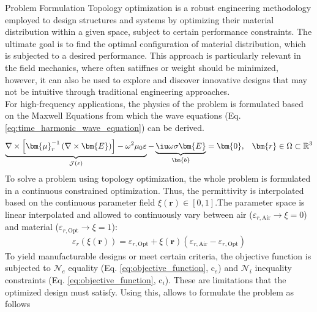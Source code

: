 \begin{frame}[t]
\begin{columns}[t]
\begin{column}{\colwidth}
    \begin{block}{Problem Formulation}
      Topology optimization is a robust engineering methodology employed to design structures and systems by optimizing their material distribution within a given space, subject to certain performance constraints. 
      The ultimate goal is to find the optimal configuration of material distribution, which is subjected to a desired performance.  This approach is particularly relevant in the field mechanics, where often satiffnes or weight should be minimized, however, it can also be used to explore and discover innovative designs that may not be intuitive through traditional engineering approaches.\\
      For high-frequency applications, the physics of the problem is formulated based on the Maxwell Equations from which the wave equations (Eq. \ref{eq:time_harmonic_wave_equation}) can be derived. 
        \begin{equation}
          \begin{aligned}   
            \underbrace{
            \nabla \times \left[ \bm{\mu}_r^{-1} \left ( \nabla \times \bm{E} \right ) \right]
            -\omega^2\mu_0\varepsilon }_{\mathcal{J}(\varepsilon)}  - \underbrace{\iu \omega \sigma \bm{E}}_{\bm{b}} &= \bm{0}, & \bm{r} \in \Omega \subset \mathbb{R}^3
            \label{eq:time_harmonic_wave_equation}
        \end{aligned}
        \end{equation}
        To solve a problem using topology optimization, the whole problem is formulated in a continuous constrained optimization. Thus, the permittivity is interpolated based on the continuous parameter field 
        $\xi(\bm{r}) \in [0, 1]$.The parameter space is linear interpolated and allowed to continuously vary between air ($\varepsilon_{r,  \mathrm{Air}} \rightarrow \xi=0$) and material ($\varepsilon_{r, \mathrm{Opt}} \rightarrow \xi=1$):
    \begin{align}
        \varepsilon_r(\xi(\bm{r})) = \varepsilon_{r, \mathrm{Opt}} + \xi(\bm{r})\left ( \varepsilon_{r, \mathrm{Air}} - \varepsilon_{r, \mathrm{Opt}} \right )
    \end{align}
    To yield manufacturable designs or meet certain criteria, the objective function is subjected to $\mathcal{N}_e$ equality (Eq. \ref{eq:objective_function},  $\mathrm{c}_e$) and $\mathcal{N}_i$ inequality constraints (Eq. \ref{eq:objective_function},  $\mathrm{c}_i$). These are limitations that the optimized design must satisfy. Using this, allows to formulate the problem as follows

\end{block}
\end{column}
\end{columns}
\end{frame}
